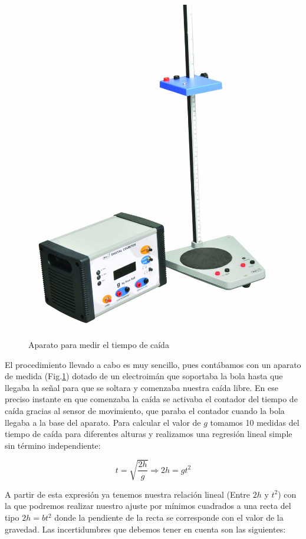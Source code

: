 \documentclass[a4paper,12pt,titlepage]{article}
\begin{document}
\begin{figure}
    \centering
    \includegraphics[width=0.7\linewidth]{Images/caidalibreaparato.jpg}
    \caption{Aparato para medir el tiempo de caída}
    \label{Montaje caida}
\end{figure}

El procedimiento llevado a cabo es muy sencillo, pues contábamos con un aparato de medida (Fig.\ref{Montaje caida}) dotado de un electroimán que soportaba la bola hasta que llegaba la señal para que se soltara y comenzaba nuestra caída libre. En ese preciso instante en que comenzaba la caída se activaba el contador del tiempo de caída gracias al sensor de movimiento, que paraba el contador cuando la bola llegaba a la base del aparato. Para calcular el valor de $g$ tomamos 10 medidas del tiempo de caída para diferentes alturas y realizamos una regresión lineal simple sin término independiente:

\begin{equation}
    t = \sqrt{\frac{2h}{g}} \Rightarrow 2h = gt^2
    \label{Ajuste gravedad}
\end{equation}

A partir de esta expresión ya tenemos nuestra relación lineal (Entre $2h$ y $t^2$) con la que podremos realizar nuestro ajuste por mínimos cuadrados a una recta del tipo $2h=bt^2$ donde la pendiente de la recta se corresponde con el valor de la gravedad. Las incertidumbres que debemos tener en cuenta son las siguientes:
\end{document}
